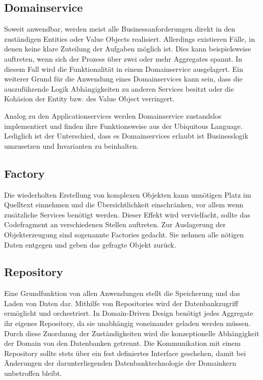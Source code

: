 \subsection{Domainservice}

Soweit anwendbar, werden meist alle Businessanforderungen direkt in den  zuständigen Entities oder Value Objects realisiert. Allerdings existieren Fälle, in denen keine klare Zuteilung der Aufgaben möglich ist. Dies kann beispielsweise auftreten, wenn sich der Prozess über zwei oder mehr Aggregates spannt. In diesem Fall wird die Funktionalität in einem Domainservice ausgelagert. Ein weiterer Grund für die Anwendung eines Domainservices kann sein, dass die auszuführende Logik Abhängigkeiten zu anderen Services besitzt oder die Kohäsion der Entity bzw. des Value Object verringert. 

Analog zu den Applicationservices werden Domainservice zustandslos implementiert und finden ihre Funktionsweise aus der Ubiquitous Language. Lediglich ist der Unterschied, dass es Domainservices erlaubt ist Businesslogik umzusetzen und Invarianten zu beinhalten.

\subsection{Factory}

Die wiederholten Erstellung von komplexen Objekten kann unnötigen Platz im Quelltext einnehmen und die Übersichtlichkeit einschränken, vor allem wenn zusätzliche Services benötigt werden. Dieser Effekt wird vervielfacht, sollte das Codefragment an verschiedenen Stellen auftreten. Zur Auslagerung der Objekterzeugung sind sogenannte Factories gedacht. Sie nehmen alle nötigen Daten entgegen und geben das gefragte Objekt zurück.

\subsection{Repository}

Eine Grundfunktion von allen Anwendungen stellt die Speicherung und das Laden von Daten dar. Mithilfe von Repositories wird der Datenbankzugriff ermöglicht und orchestriert. In Domain-Driven Design benötigt jedes Aggregate ihr eigenes Repository, da sie unabhängig voneinander geladen werden müssen. Durch diese Zuordnung der Zuständigkeiten wird die konzeptionelle Abhängigkeit der Domain von den Datenbanken getrennt. Die Kommunikation mit einem Repository sollte stets über ein fest definiertes Interface geschehen, damit bei Änderungen der darunterliegenden Datenbanktechnologie der Domainkern unbetroffen bleibt. 

